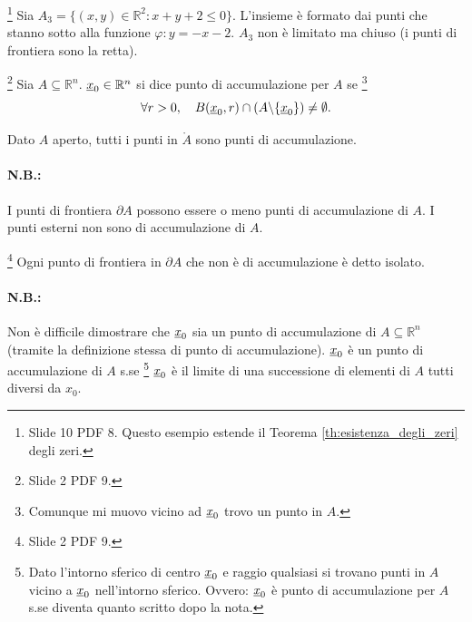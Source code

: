\begin{example}\footnote{Slide 10 PDF 8. Questo esempio estende il Teorema \ref{th:esistenza_degli_zeri} degli zeri.}
    Sia $A_3=\{(x,y)\in\mathbb R^2\colon x+y+2\leq 0\}$. L'insieme è formato dai punti che stanno sotto alla funzione $\varphi:y=-x-2$. $A_3$ non è limitato ma chiuso (i punti di frontiera sono la retta). \footnotemark
\end{example}


\begin{definition}\footnote{Slide 2 PDF 9.}
    Sia $A\subseteq\mathbb R^n$. $\uline x_0\in\mathbb R^n$ si dice punto di accumulazione per $A$ se \footnote{Comunque mi muovo vicino ad $\uline x_0$ trovo un punto in $A$.}
    \begin{equation*}
        \forall r>0,\quad B(\uline x_0, r)\cap (A\backslash\{\uline x_0\})\neq\emptyset.
    \end{equation*}
\end{definition}

\begin{remark}
    Dato $A$ aperto, tutti i punti in $\mathring A$ sono punti di accumulazione.
\end{remark}

\paragraph{N.B.:} I punti di frontiera $\partial A$ possono essere o meno punti di accumulazione di $A$. I punti esterni non sono di accumulazione di $A$.

\begin{definition}\footnote{Slide 2 PDF 9.}
    Ogni punto di frontiera in $\partial A$ che non è di accumulazione è detto isolato.
\end{definition}

\paragraph{N.B.:} Non è difficile dimostrare che $\uline x_0$ sia un punto di accumulazione di $A\subseteq\mathbb R^n$ (tramite la definizione stessa di punto di accumulazione). $\uline x_0$ è un punto di accumulazione di $A$ s.se \footnote{Dato l'intorno sferico di centro $\uline x_0$ e raggio qualsiasi si trovano punti in $A$ vicino a $\uline x_0$ nell'intorno sferico. Ovvero: $\uline x_0$ è punto di accumulazione per $A$ s.se diventa quanto scritto dopo la nota.} $\uline x_0$ è il limite di una successione di elementi di $A$ tutti diversi da $x_0$.

